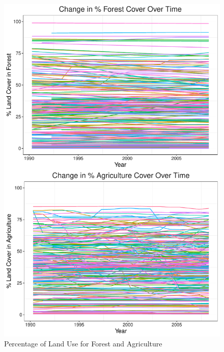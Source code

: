 \documentclass[12pt,]{article}
\begin{document}
\begin{figure}
\centering
\includegraphics{Marx_ENV872_Project_files/figure-latex/unnamed-chunk-3-1.pdf}
\caption{\label{fig:fig2}Percentage of Land Use for Forest and
Agriculture}
\end{figure}
\end{document}
